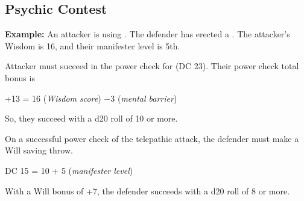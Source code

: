\subsection{Psychic Contest}

\textbf{Example:} An attacker is using . The defender has erected a . The attacker's Wisdom is 16, and their manifester level is 5th.
\begin{enumerate*}
	\item Attacker must succeed in the power check for  (DC 23). Their power check total bonus is

	\begin{Formula}{+13 = 16 (\textit{Wisdom score}) $-3$ (\textit{mental barrier})}\end{Formula}

	So, they succeed with a d20 roll of 10 or more.


	\item On a successful power check of the telepathic attack, the defender must make a Will saving throw.

	\begin{Formula}{DC 15 = 10 + 5 (\textit{manifester level})}\end{Formula}

	With a Will bonus of +7, the defender succeeds with a d20 roll of 8 or more.
\end{enumerate*}
